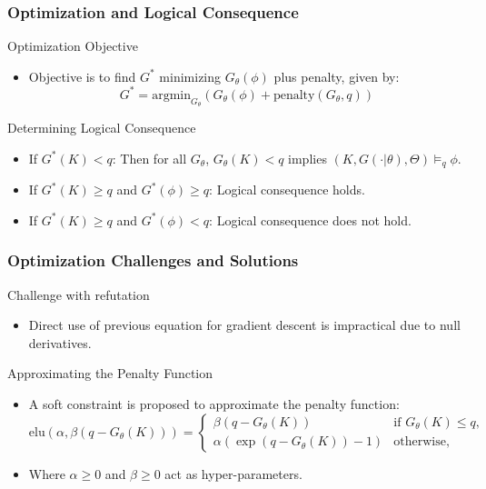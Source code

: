 \documentclass{beamer}
\begin{document}
\begin{frame}
\frametitle{Optimization and Logical Consequence}
\begin{block}{Optimization Objective}
\begin{itemize}
    \item Objective is to find \( G^* \) minimizing \( G_\theta(\phi) \) plus penalty, given by:
    \[ G^* = \text{argmin}_{G_\theta} \left( G_\theta(\phi) + \text{penalty}(G_\theta, q) \right) \]
\end{itemize}
\end{block}

\begin{block}{Determining Logical Consequence}
\begin{itemize}
    \item If \( G^*(K) < q \): Then for all \( G_\theta \), \( G_\theta(K) < q \) implies \( (K, G(\cdot | \theta), \Theta) \models_q \phi \).
    \item If \( G^*(K) \geq q \) and \( G^*(\phi) \geq q \): Logical consequence holds.
    \item If \( G^*(K) \geq q \) and \( G^*(\phi) < q \): Logical consequence does not hold.
\end{itemize}
\end{block}
\end{frame}

\begin{frame}
\frametitle{Optimization Challenges and Solutions}
\begin{block}{Challenge with refutation}
\begin{itemize}
    \item Direct use of previous equation for gradient descent is
      impractical due to null derivatives.
\end{itemize}
\end{block}

\begin{block}{Approximating the Penalty Function}
\begin{itemize}
    \item A soft constraint is proposed to approximate the penalty function:
    \[ \text{elu}(\alpha, \beta(q - G_\theta(K))) = 
    \begin{cases} 
    \beta(q - G_\theta(K)) & \text{if } G_\theta(K) \leq q, \\
    \alpha(\exp(q-G_\theta(K)) - 1) & \text{otherwise},
    \end{cases} \]
    \item Where \( \alpha \geq 0 \) and \( \beta \geq 0 \) act as hyper-parameters.
\end{itemize}
\end{block}
\end{frame}
\end{document}
